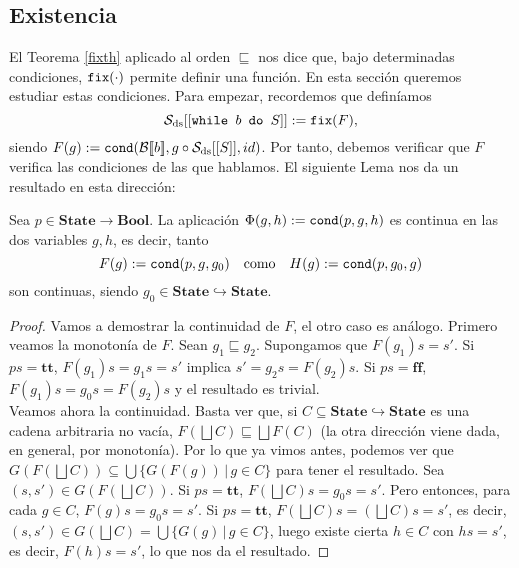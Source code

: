 \subsection{Existencia}

El Teorema \ref{fixth} aplicado al orden $\sqsubseteq$ nos dice que, bajo determinadas condiciones, $\texttt{fix}(\cdot)$ permite definir una función. En esta sección queremos estudiar estas condiciones. Para empezar, recordemos que definíamos 
$$\mathcal{S}_{\mathrm{ds}} [[\texttt{while } b \texttt{ do } S]] :=  \texttt{fix}(F),$$
siendo $F(g) := \texttt{cond}(\mathcal{B}[\![b]\!], g\circ \mathcal{S}_{\mathrm{ds}}[[S]], id)$. Por tanto, debemos verificar que $F$ verifica las condiciones de las que hablamos. El siguiente Lema nos da un resultado en esta dirección:

\begin{lema}
Sea $p \in \mathbf{State}\to\mathbf{Bool}$. La aplicación $\Phi(g, h) := \texttt{cond}(p, g, h)$ es continua en las dos variables $g, h$, es decir, tanto
$$F(g) := \texttt{cond}(p, g, g_0) \quad \text{como} \quad H(g) := \texttt{cond}(p, g_0, g)$$
son continuas, siendo $g_0 \in \mathbf{State}\hookrightarrow\mathbf{State}$.
\end{lema}
\begin{proof}
Vamos a demostrar la continuidad de $F$, el otro caso es análogo. Primero veamos la monotonía de $F$. Sean $g_1 \sqsubseteq g_2$. Supongamos que $F(g_1)s = s'$. Si $ps = \mathbf{tt}$, $F(g_1)s = g_1s = s'$ implica $s' = g_2s = F(g_2)s$. Si $ps = \mathbf{ff}$, $F(g_1)s = g_0s = F(g_2)s$ y el resultado es trivial.
\\

Veamos ahora la continuidad. Basta ver que, si $C \subseteq \mathbf{State}\hookrightarrow\mathbf{State}$ es una cadena arbitraria no vacía, $F(\bigsqcup C) \sqsubseteq \bigsqcup F(C)$ (la otra dirección viene dada, en general, por monotonía). Por lo que ya vimos antes, podemos ver que $G(F(\bigsqcup C)) \subseteq \bigcup \{G(F(g)) \, | \, g \in C\}$ para tener el resultado. Sea $(s, s')\in G(F(\bigsqcup C))$. Si $ps = \mathbf{tt}$, $F(\bigsqcup C)s = g_0s= s'$. Pero entonces, para cada $g \in C$, $F(g)s = g_0s = s'$. Si $ps = \mathbf{tt}$, $F(\bigsqcup C)s = (\bigsqcup C)s = s'$, es decir, $(s, s')\in G(\bigsqcup C) = \bigcup \{G(g) \, | \, g \in C\}$, luego existe cierta $h \in C$ con $hs = s'$, es decir, $F(h)s = s'$, lo que nos da el resultado.
\end{proof}

